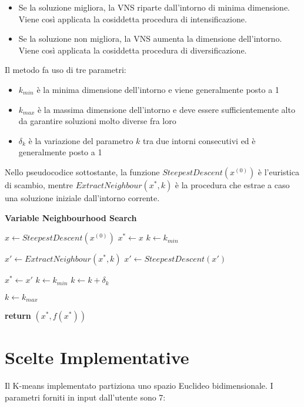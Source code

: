 \documentclass[12pt,a4paper,oneside,hidelinks]{report}
\begin{document}
\begin{itemize}
\item Se la soluzione migliora, la VNS riparte dall'intorno di minima dimensione. Viene così applicata la cosiddetta procedura di intensificazione.
\item Se la soluzione non migliora, la VNS aumenta la dimensione dell'intorno. Viene così applicata la cosiddetta procedura di diversificazione.
\end{itemize}

Il metodo fa uso di tre parametri:

\begin{itemize}
\item $k_{min}$ è la minima dimensione dell'intorno e viene generalmente posto a 1 
\item $k_{max}$ è la massima dimensione dell'intorno e deve essere sufficientemente alto da garantire soluzioni molto diverse fra loro
\item $\delta_k$ è la variazione del parametro $k$ tra due intorni consecutivi ed è generalmente posto a 1
\end{itemize}

Nello pseudocodice sottostante, la funzione \textit{$SteepestDescent(x^{(0)})$} è l'euristica di scambio, mentre \textit{$ExtractNeighbour(x^*, k)$} è la procedura che estrae a caso una soluzione iniziale dall'intorno corrente.

\begin{algorithm}
\caption{\textbf{Variable Neighbourhood Search}}
\begin{algorithmic}[1]
\State $x\gets SteepestDescent(x^{(0)})$
\State $x^*\gets x$
\State $k\gets k_{min}$
\item[]
	\State $x'\gets ExtractNeighbour(x^*, k)$
	\State $x'\gets SteepestDescent(x')$
	\item[]
		\State $x^*\gets x'$
		\State $k\gets k_{min}$
	\Else
		\State $k\gets k + \delta_k$
	\EndIf 
	\item[]
		\State $k\gets k_{max}$
	\EndIf 
\EndFor
\item[]
\State \textbf{return} $(x^*, f(x^*))$\;
\EndFunction
\end{algorithmic}
\end{algorithm}

\section*{Scelte Implementative}
Il K-means implementato partiziona uno spazio Euclideo bidimensionale. I parametri forniti in input dall'utente sono 7:
\end{document}
